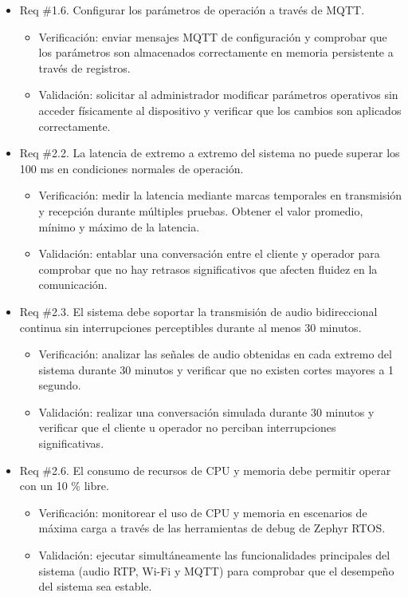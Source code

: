 \documentclass[
11pt, %
]{charter}
\begin{document}
\begin{itemize}
	\item Req \#1.6. Configurar los parámetros de operación a través de MQTT.
	\begin{itemize}
		\item Verificación: enviar mensajes MQTT de configuración y comprobar que los parámetros son almacenados correctamente en memoria persistente a través de registros.
		\item Validación: solicitar al administrador modificar parámetros operativos sin acceder físicamente al dispositivo y verificar que los cambios son aplicados correctamente.
	\end{itemize}
	
	\item Req \#2.2. La latencia de extremo a extremo del sistema no puede superar los 100 ms en condiciones normales de operación.
	\begin{itemize}
		\item Verificación: medir la latencia mediante marcas temporales en transmisión y recepción durante múltiples pruebas. Obtener el valor promedio, mínimo y máximo de la latencia.
		\item Validación: entablar una conversación entre el cliente y operador para comprobar que no hay retrasos significativos que afecten fluidez en la comunicación.
	\end{itemize}
	
	\item Req \#2.3. El sistema debe soportar la transmisión de audio bidireccional continua sin interrupciones perceptibles durante al menos 30 minutos.
	\begin{itemize}
		\item Verificación: analizar las señales de audio obtenidas en cada extremo del sistema durante 30 minutos y verificar que no existen cortes mayores a 1 segundo.
		\item Validación: realizar una conversación simulada durante 30 minutos y verificar que el cliente u operador no perciban interrupciones significativas.
	\end{itemize}
	
	\item Req \#2.6. El consumo de recursos de CPU y memoria debe permitir operar con un 10 \% libre.
	\begin{itemize}
		\item Verificación: monitorear el uso de CPU y memoria en escenarios de máxima carga a través de las herramientas de debug de Zephyr RTOS.
		\item Validación: ejecutar simultáneamente las funcionalidades principales del sistema (audio RTP, Wi-Fi y MQTT) para comprobar que el desempeño del sistema sea estable.
	\end{itemize}
	

\end{itemize}
\end{document}
